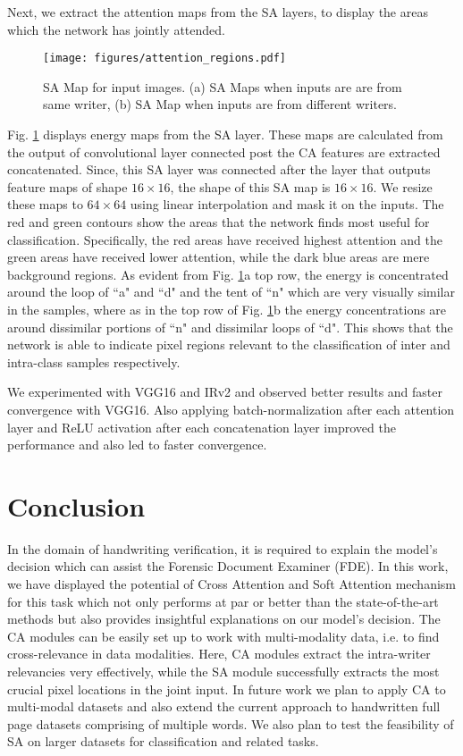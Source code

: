 \documentclass[a4paper,conference]{IEEEtran}
\begin{document}
Next, we extract the attention maps from the SA layers, to display the areas which the network has jointly attended.
\begin{figure}[!h]
\begin{center}
\texttt{[image: figures/attention\_regions.pdf]}
\caption{\label{fig:sa_attentionmaps} SA Map for input images. (a) SA Maps when inputs are are from same writer, (b) SA Map when inputs are from different writers.}
\end{center}
\end{figure}
Fig. \ref{fig:sa_attentionmaps} displays energy maps from the SA layer. These maps are calculated from the output of convolutional layer connected post the CA features are extracted concatenated. Since, this SA layer was connected after the layer that outputs feature maps of shape $16 \times 16$, the shape of this SA map is $16 \times 16$. We resize these maps to $64 \times 64$ using linear interpolation and mask it on the inputs. The red and green contours show the areas that the network finds most useful for classification. Specifically, the red areas have received highest attention and the green areas have received lower attention, while the dark blue areas are mere background regions. As evident from Fig. \ref{fig:sa_attentionmaps}a top row, the energy is concentrated around the loop of ``a" and ``d" and the tent of ``n" which are very visually similar in the samples, where as in the top row of Fig. \ref{fig:sa_attentionmaps}b the energy concentrations are around dissimilar portions of ``n" and dissimilar loops of ``d". This shows that the network is able to indicate pixel regions relevant to the classification of inter and intra-class samples respectively.

We experimented with VGG16 and IRv2 and observed better results and faster convergence with VGG16. Also applying batch-normalization after each attention layer and ReLU activation after each concatenation layer improved the performance and also led to faster convergence.

\section{Conclusion}
In the domain of handwriting verification, it is required to explain the model's decision which can assist the Forensic Document Examiner (FDE). In this work, we have displayed the potential of Cross Attention and Soft Attention mechanism for this task which not only performs at par or better than the state-of-the-art methods but also provides insightful explanations on our model's decision. The CA modules can be easily set up to work with multi-modality data, i.e. to find cross-relevance in data modalities. Here, CA modules extract the intra-writer relevancies very effectively, while the SA module successfully extracts the most crucial pixel locations in the joint input. In future work we plan to apply CA to multi-modal datasets and also extend the current approach to handwritten full page datasets comprising of multiple words. We also plan to test the feasibility of SA on larger datasets for classification and related tasks.



 

\end{document}
